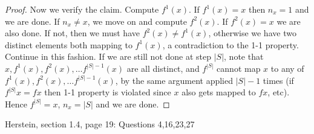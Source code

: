 \begin{enumerate}
\begin{proof}
	Now we verify the claim. Compute $f^1(x)$. If $f^1(x) = x$ then $n_x = 1$ and we are done. If $n_x \neq  x $, we move on and compute $f^2(x)$. If $f^2(x) = x$ we are also done. 
	If not, then we must have $f^2(x) \neq f^1(x)$, otherwise we have two distinct elements both mapping to $f^1(x)$, a contradiction to the 1-1 property. Continue in this fashion. If we are still not done at step $|S|$, note that $x, f^1(x), f^2(x),\ldots f^{|S|-1}(x)$ are all distinct, and $f^{|S|}$ cannot map $x$ to any of $f^1(x), f^2(x),\ldots f^{|S|-1}(x)$, by the same argument applied $|S|-1$ times (if $f^{|S|}x = fx$ then 1-1 property is violated since $x$ also gets mapped to $fx$, etc). Hence $f^{|S|} = x$, $n_x = |S|$ and we are done.
\end{proof}
\end{enumerate}
Herstein, section 1.4, page 19: Questions 4,16,23,27
